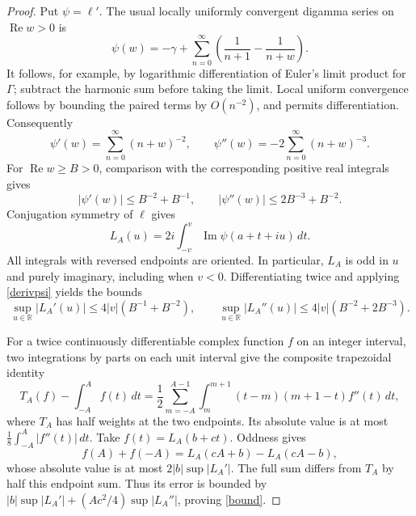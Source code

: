 \documentclass[10pt]{article}
\DeclareMathOperator{\Impart}{Im}
\DeclareMathOperator{\Repart}{Re}
\begin{document}
\begin{proof}
Put $\psi=\ell'$. The usual locally uniformly convergent digamma
series on $\Repart w>0$ is
\begin{equation}\label{psi}
 \psi(w)=-\gamma+\sum_{n=0}^{\infty}
 \left(\frac1{n+1}-\frac1{n+w}\right).
\end{equation}
It follows, for example, by logarithmic differentiation of Euler's
limit product for $\Gamma$; subtract the harmonic sum before taking
the limit. Local uniform convergence follows by bounding the paired
terms by $O(n^{-2})$, and permits differentiation. Consequently
\[
 \psi'(w)=\sum_{n=0}^{\infty}(n+w)^{-2},\qquad
 \psi''(w)=-2\sum_{n=0}^{\infty}(n+w)^{-3}.
\]
For $\Repart w\ge B>0$, comparison with the corresponding positive
real integrals gives
\begin{equation}\label{derivpsi}
 |\psi'(w)|\le B^{-2}+B^{-1},\qquad
 |\psi''(w)|\le2B^{-3}+B^{-2}.
\end{equation}
Conjugation symmetry of $\ell$ gives
\begin{equation}\label{intpsi}
 L_A(u)=2i\int_{-v}^{v}\Impart\psi(a+t+iu)\,dt.
\end{equation}
All integrals with reversed endpoints are oriented. In particular,
$L_A$ is odd in $u$ and purely imaginary, including when $v<0$.
Differentiating twice and applying \eqref{derivpsi} yields the bounds
\begin{equation}\label{derivL}
 \sup_{u\in\mathbb R}|L_A'(u)|\le4|v|(B^{-1}+B^{-2}),\qquad
 \sup_{u\in\mathbb R}|L_A''(u)|\le4|v|(B^{-2}+2B^{-3}).
\end{equation}

For a twice continuously differentiable complex function $f$ on an
integer interval, two integrations by parts on each unit interval
give the composite trapezoidal identity
\[
 T_A(f)-\int_{-A}^{A}f(t)\,dt
 =\frac12\sum_{m=-A}^{A-1}\int_m^{m+1}
 (t-m)(m+1-t)f''(t)\,dt,
\]
where $T_A$ has half weights at the two endpoints. Its absolute value
is at most $\frac18\int_{-A}^{A}|f''(t)|\,dt$.
Take $f(t)=L_A(b+ct)$. Oddness gives
\[
 f(A)+f(-A)=L_A(cA+b)-L_A(cA-b),
\]
whose absolute value is at most $2|b|\sup|L_A'|$.
The full sum differs from $T_A$ by half this endpoint sum. Thus its
error is bounded by
$|b|\sup|L_A'|+(Ac^2/4)\sup|L_A''|$, proving \eqref{bound}.


\end{proof}
\end{document}
